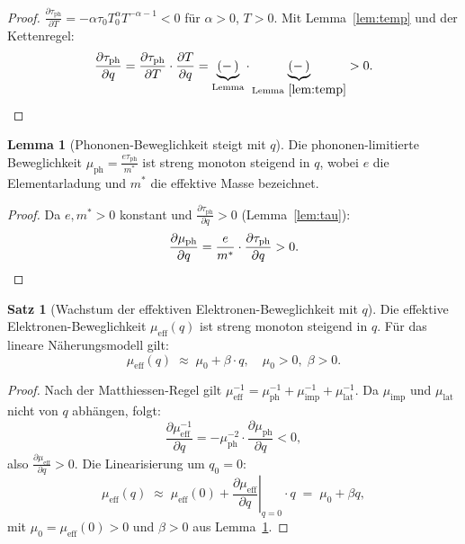 ﻿\documentclass[a4paper,12pt]{article}
\theoremstyle{definition}
\newtheorem{satz}{Satz}
\newtheorem{lemma}{Lemma}
\begin{document}
\begin{proof}
$\frac{\partial \tau_{\mathrm{ph}}}{\partial T} = -\alpha \tau_0 T_0^\alpha T^{-\alpha-1} < 0$
für $\alpha > 0$, $T > 0$. Mit Lemma~\ref{lem:temp} und der Kettenregel:
\[
\frac{\partial \tau_{\mathrm{ph}}}{\partial q}
= \frac{\partial \tau_{\mathrm{ph}}}{\partial T} \cdot \frac{\partial T}{\partial q}
= \underbrace{(-\,)}_{\text{Lemma}} \cdot \underbrace{(-\,)}_{\text{Lemma}~\ref{lem:temp}} > 0. \qedhere
\]
\end{proof}

\begin{lemma}[Phononen-Beweglichkeit steigt mit $q$]
\label{lem:mu_ph}
Die phononen-limitierte Beweglichkeit
$\mu_{\mathrm{ph}} = \frac{e \tau_{\mathrm{ph}}}{m^*}$ ist streng monoton steigend in $q$,
wobei $e$ die Elementarladung und $m^*$ die effektive Masse bezeichnet.
\end{lemma}

\begin{proof}
Da $e, m^* > 0$ konstant und $\frac{\partial \tau_{\mathrm{ph}}}{\partial q} > 0$
(Lemma~\ref{lem:tau}):
\[
\frac{\partial \mu_{\mathrm{ph}}}{\partial q} = \frac{e}{m^*} \cdot \frac{\partial \tau_{\mathrm{ph}}}{\partial q} > 0. \qedhere
\]
\end{proof}

\begin{satz}[Wachstum der effektiven Elektronen-Beweglichkeit mit $q$]
\label{satz:mu_q}
Die effektive Elektronen-Beweglichkeit $\mu_{\mathrm{eff}}(q)$ ist streng monoton steigend
in $q$. Für das lineare Näherungsmodell gilt:
\[
\mu_{\mathrm{eff}}(q) \;\approx\; \mu_0 + \beta \cdot q, \quad \mu_0 > 0,\; \beta > 0.
\]
\end{satz}

\begin{proof}
Nach der Matthiessen-Regel gilt
$\mu_{\mathrm{eff}}^{-1} = \mu_{\mathrm{ph}}^{-1} + \mu_{\mathrm{imp}}^{-1} + \mu_{\mathrm{lat}}^{-1}$.
Da $\mu_{\mathrm{imp}}$ und $\mu_{\mathrm{lat}}$ nicht von $q$ abhängen, folgt:
\[
\frac{\partial \mu_{\mathrm{eff}}^{-1}}{\partial q}
= -\mu_{\mathrm{ph}}^{-2} \cdot \frac{\partial \mu_{\mathrm{ph}}}{\partial q} < 0,
\]
also $\frac{\partial \mu_{\mathrm{eff}}}{\partial q} > 0$. Die Linearisierung um $q_0 = 0$:
\[
\mu_{\mathrm{eff}}(q) \;\approx\; \mu_{\mathrm{eff}}(0) + \left.\frac{\partial \mu_{\mathrm{eff}}}{\partial q}\right|_{q=0} \cdot q \;=\; \mu_0 + \beta q,
\]
mit $\mu_0 = \mu_{\mathrm{eff}}(0) > 0$ und $\beta > 0$ aus Lemma~\ref{lem:mu_ph}. \qedhere
\end{proof}
\end{document}

